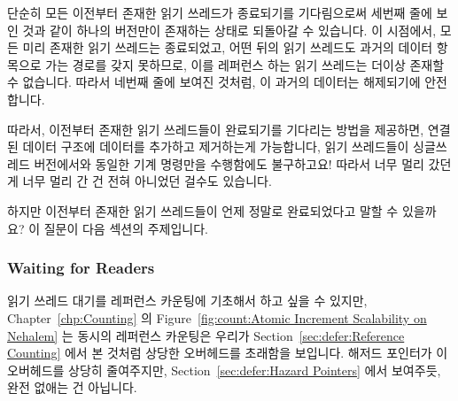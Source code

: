 단순히 모든 이전부터 존재한 읽기 쓰레드가 종료되기를 기다림으로써 세번째 줄에
보인 것과 같이 하나의 버전만이 존재하는 상태로 되돌아갈 수 있습니다.
이 시점에서, 모든 미리 존재한 읽기 쓰레드는 종료되었고, 어떤 뒤의 읽기 쓰레드도
과거의 데이터 항목으로 가는 경로를 갖지 못하므로, 이를 레퍼런스 하는 읽기
쓰레드는 더이상 존재할 수 없습니다.
따라서 네번째 줄에 보여진 것처럼, 이 과거의 데이터는 해제되기에 안전합니다.

따라서, 이전부터 존재한 읽기 쓰레드들이 완료되기를 기다리는 방법을 제공하면,
연결된 데이터 구조에 데이터를 추가하고 제거하는게 가능합니다, 읽기 쓰레드들이
싱글쓰레드 버전에서와 동일한 기계 명령만을 수행함에도 불구하고요!
따라서 너무 멀리 갔던게 너무 멀리 간 건 전혀 아니었던 걸수도 있습니다.

하지만 이전부터 존재한 읽기 쓰레드들이 언제 정말로 완료되었다고 말할 수
있을까요?
이 질문이 다음 섹션의 주제입니다.

\subsubsection{Waiting for Readers}
\label{sec:defer:Waiting for Readers}

읽기 쓰레드 대기를 레퍼런스 카운팅에 기초해서 하고 싶을 수 있지만,
Chapter~\ref{chp:Counting} 의
Figure~\ref{fig:count:Atomic Increment Scalability on Nehalem}
는 동시의 레퍼런스 카운팅은 우리가
Section~\ref{sec:defer:Reference Counting} 에서 본 것처럼 상당한 오버헤드를
초래함을 보입니다.
해저드 포인터가 이 오버헤드를 상당히 줄여주지만,
Section~\ref{sec:defer:Hazard Pointers} 에서 보여주듯, 완전 없애는 건 아닙니다.
\iffalse

